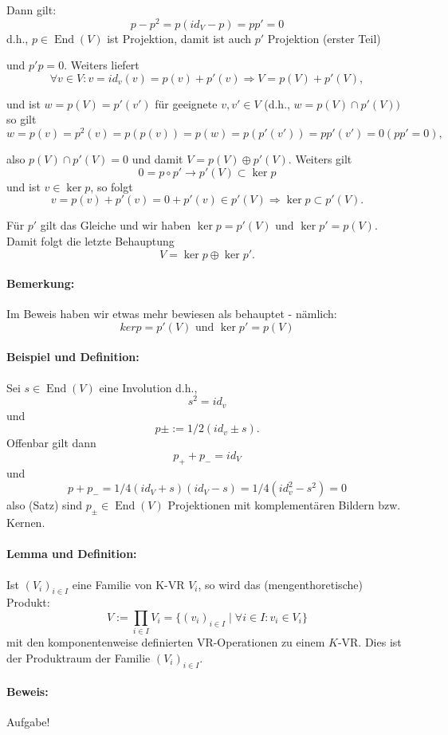 	Dann gilt:
		\[p-p^2 = p(id_V-p) = pp' = 0\]
	d.h., $p\in\operatorname{End}(V)$ ist Projektion, damit ist auch $p'$ Projektion (erster Teil)

	und $p' p = 0 $. Weiters liefert
		\[\forall v\in V: v=id_v(v) = p(v) + p'(v) \Rightarrow V = p(V)+p'(V),\]

	und ist $w = p(V)= p'(v')$ für geeignete $v,v'\in V$ (d.h., $w  = p(V)\cap p'(V))$ so gilt
		\[w = p(v) = p^2(v) = p(p(v)) = p(w) = p(p'(v')) = pp'(v') = 0 (pp' = 0),\]
		
	also $p(V)\cap p'(V) = {0}$ und damit $V = p(V)\oplus p'(V)$. Weiters gilt
		\[0 = p \circ p' \rightarrow p'(V)\subset \ker p\]
	und ist $v\in \ker p$, so folgt
		\[v = p(v) + p'(v) = 0 + p'(v)\in p'(V) \Rightarrow \ker p \subset p'(V).\]
		
	Für $p'$ gilt das Gleiche und wir haben $\ker p = p'(V)$ und $\ker p' = p(V)$. Damit folgt die letzte Behauptung 
		\[V = \ker p \oplus\ker p'.\]
	
\paragraph{Bemerkung: }
		Im Beweis haben wir etwas mehr bewiesen als behauptet - nämlich:
			\[ ker p = p'(V)\text{ und }\ker p' = p(V) \]
		
\paragraph{Beispiel und Definition: }	
		Sei $s\in \operatorname{End}(V)$ eine Involution d.h., 
			\[s^2 = id_v\] 
		und 
			\[p\pm := 1/2(id_v\pm s).\]
		Offenbar gilt dann
			\[p_{+} + p_{-} = id_V\] 
		und 
			\[p + p_{-} = 1/4(id_V +s)(id_V -s) = 1/4(id_v^2-s^2)=0\]
		also (Satz) sind $p_\pm\in\operatorname{End}(V)$ Projektionen mit komplementären Bildern bzw. Kernen.
		
\paragraph{Lemma und Definition: }
		Ist $(V_i)_{i\in I}$ eine Familie von K-VR $V_i$, so wird das (mengenthoretische) Produkt:
			\[V:= \prod_{i\in I}V_i=\{(v_i)_{i\in I}\mid\forall i\in I:v_i\in V_i\}\]
		mit den komponentenweise definierten VR-Operationen zu einem $ K $-VR. Dies ist der Produktraum der Familie	$(V_i)_{i\in I}$.
		
\paragraph{Beweis: } Aufgabe!

